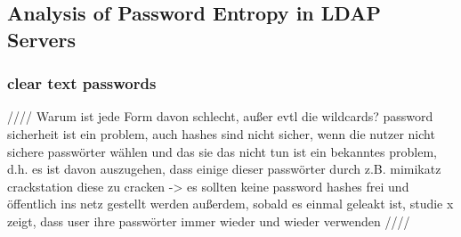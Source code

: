 \begin{table}[!ht]
\end{table}

\subsection{Analysis of Password Entropy in LDAP Servers}



\subsubsection{clear text passwords}

////
Warum ist jede Form davon schlecht, außer evtl die wildcards?
password sicherheit ist ein problem, auch hashes sind nicht sicher, wenn die nutzer nicht sichere passwörter wählen und das sie das nicht tun ist ein bekanntes problem, d.h. es ist davon auszugehen, dass einige dieser passwörter durch z.B. mimikatz crackstation diese zu cracken -> es sollten keine password hashes frei und öffentlich ins netz gestellt werden
außerdem, sobald es einmal geleakt ist, studie x zeigt, dass user ihre passwörter immer wieder und wieder verwenden
////

